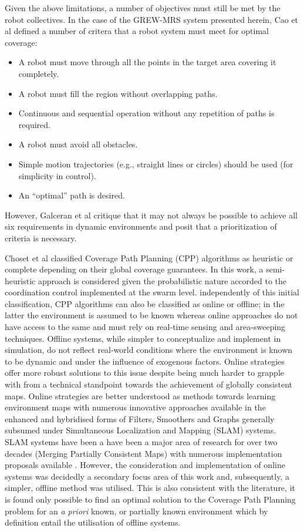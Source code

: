 \documentclass{report}
\begin{document}
Given the above limitations, a number of objectives must still be met by the robot collectives. In the case of the GREW-MRS system presented herein, Cao et al \cite{Cao1988} defined a number of critera that a robot system must meet for optimal coverage:
\begin{itemize}
	\item A robot must move through all the points in the target area covering it completely.
	\item A robot must fill the region without overlapping paths.
	\item Continuous and sequential operation without any repetition of paths is required.
	\item A robot must avoid all obstacles.
	\item Simple motion trajectories (e.g., straight lines or circles) should be used (for simplicity in control).
	\item An “optimal” path is desired.
\end{itemize}

However, Galceran et al \cite{Galceran2013} critique that it may not always be possible to achieve all six requirements in dynamic environments and posit that a prioritization of criteria is necessary.

Choset et al \cite{Choset2001} classified Coverage Path Planning (CPP) algorithms as heuristic or complete depending on their global coverage guarantees. In this work, a semi-heuristic approach is considered given the probabilistic nature accorded to the coordination control implemented at the swarm level. independently of this initial classification, CPP algorithms can also be classified as online or offline; in the latter the environment is assumed to be known whereas online approaches do not have access to the same and must rely on real-time sensing and area-sweeping techniques. Offline systems, while simpler to conceptualize and implement in simulation, do not reflect real-world conditions where the environment is known to be dynamic and under the influence of exogenous factors. Online strategies offer more robust solutions to this issue despite being much harder to grapple with from a technical standpoint towards the achievement of globally consistent maps. Online strategies are better understood as methods towards learning environment maps with numerous innovative approaches available in the enhanced and hybridised forms of Filters, Smoothers and Graphs generally subsumed under Simultaneous Localization and Mapping (SLAM) systems. SLAM systems have been a have been a major area of research for over two decades (Merging Partially Consistent Maps) with numerous implementation proposals available \cite{Lu1997} \cite{Grisetti2007} \cite{Montemerlo2002} \cite{Olson2006} \cite{Smith1987} \cite{Thrun2004}. However, the consideration and implementation of online systems was decidedly a secondary focus area of this work and, subsequently, a simpler, offline method was utilised. This is also consistent with the literature, it is found only possible to find an optimal solution to the Coverage Path Planning problem for an \textit{a priori} known, or partially known environment \cite{Galceran2013} which by definition entail the utilisation of offline systems.
\end{document}

